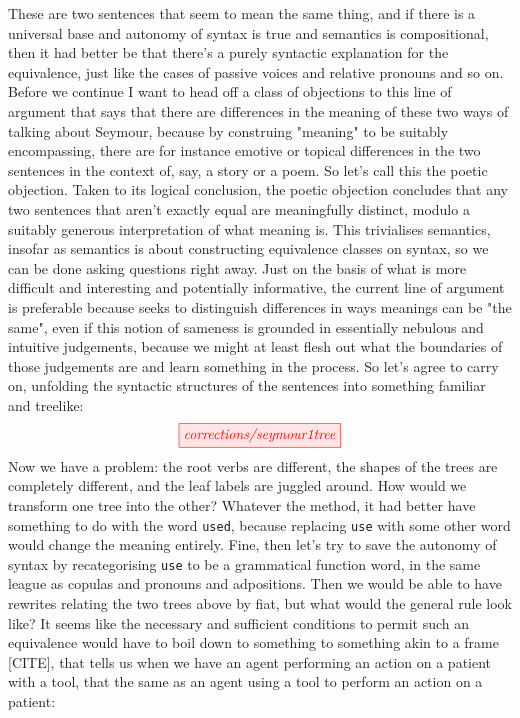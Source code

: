 These are two sentences that seem to mean the same thing, and if there is a universal base and autonomy of syntax is true and semantics is compositional, then it had better be that there's a purely syntactic explanation for the equivalence, just like the cases of passive voices and relative pronouns and so on. Before we continue I want to head off a class of objections to this line of argument that says that there are differences in the meaning of these two ways of talking about Seymour, because by construing "meaning" to be suitably encompassing, there are for instance emotive or topical differences in the two sentences in the context of, say, a story or a poem. So let's call this the poetic objection. Taken to its logical conclusion, the poetic objection concludes that any two sentences that aren't exactly equal are meaningfully distinct, modulo a suitably generous interpretation of what meaning is. This trivialises semantics, insofar as semantics is about constructing equivalence classes on syntax, so we can be done asking questions right away. Just on the basis of what is more difficult and interesting and potentially informative, the current line of argument is preferable because seeks to distinguish differences in ways meanings can be "the same", even if this notion of sameness is grounded in essentially nebulous and intuitive judgements, because we might at least flesh out what the boundaries of those judgements are and learn something in the process. So let's agree to carry on, unfolding the syntactic structures of the sentences into something familiar and treelike:
\[\tikzfig{corrections/seymour1tree}\]
Now we have a problem: the root verbs are different, the shapes of the trees are completely different, and the leaf labels are juggled around. How would we transform one tree into the other? Whatever the method, it had better have something to do with the word \texttt{used}, because replacing \texttt{use} with some other word would change the meaning entirely. Fine, then let's try to save the autonomy of syntax by recategorising \texttt{use} to be a grammatical function word, in the same league as copulas and pronouns and adpositions. Then we would be able to have rewrites relating the two trees above by fiat, but what would the general rule look like? It seems like the necessary and sufficient conditions to permit such an equivalence would have to boil down to something to something akin to a frame [CITE], that tells us when we have an agent performing an action on a patient with a tool, that the same as an agent using a tool to perform an action on a patient:
